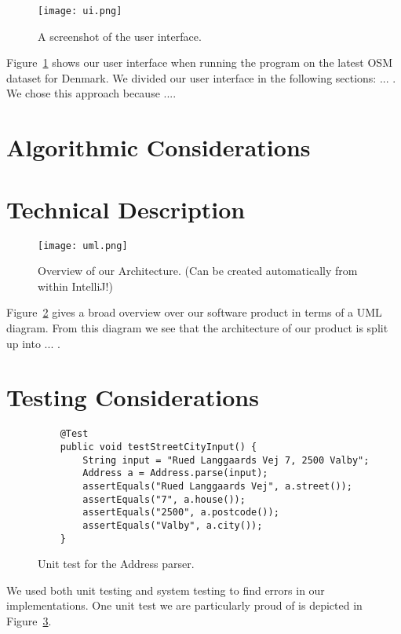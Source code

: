 \documentclass[11pt]{article}
\begin{document}
\begin{figure}
    \centering
    \texttt{[image: ui.png]}
    \caption{A screenshot of the user interface.}
    \label{fig:ui}
\end{figure}

Figure~\ref{fig:ui} shows our user interface when running the program on the latest OSM dataset for Denmark. We divided our user interface in the following sections: ... . We chose this approach because ....  

\section{Algorithmic Considerations}\label{sec:algorithms}

\section{Technical Description}\label{sec:technical}

\begin{figure}[t!]
    \centering
    \texttt{[image: uml.png]}
    \caption{Overview of our Architecture. (Can be created automatically from within IntelliJ!)}
    \label{fig:uml}
\end{figure}

Figure~\ref{fig:uml} gives a broad overview over our software product in terms of a UML diagram. From this diagram we see that the architecture of our product is split up into ... .

\section{Testing Considerations}\label{sec:testing}

\begin{figure}[t!]
    \begin{lstlisting}
    @Test
    public void testStreetCityInput() {
        String input = "Rued Langgaards Vej 7, 2500 Valby";
        Address a = Address.parse(input);
        assertEquals("Rued Langgaards Vej", a.street());
        assertEquals("7", a.house());
        assertEquals("2500", a.postcode());
        assertEquals("Valby", a.city());
    }
    \end{lstlisting}
    \caption{Unit test for the Address parser.}
    \label{fig:unittest}
\end{figure}

We used both unit testing and system testing to find errors in our implementations. One unit test we are particularly proud of is depicted in Figure~\ref{fig:unittest}. 
\end{document}
